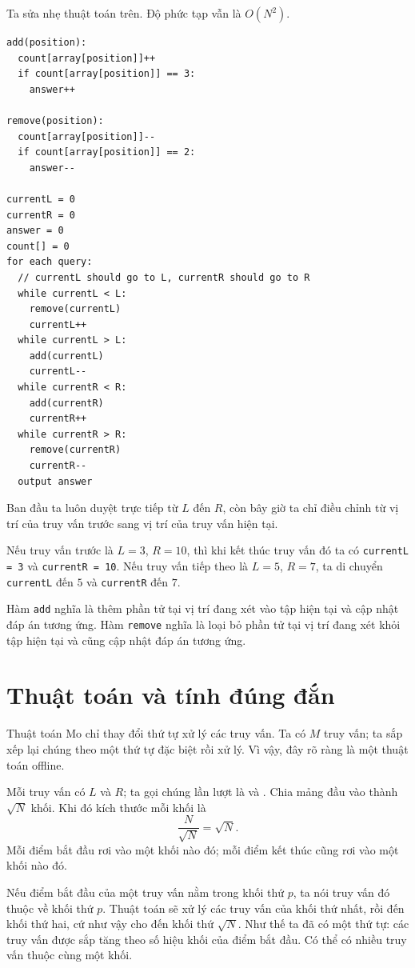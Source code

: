 \documentclass[11pt]{article}
\begin{document}
Ta sửa nhẹ thuật toán trên. Độ phức tạp vẫn là $O(N^2)$.

\begingroup
\small
\begin{verbatim}
add(position):
  count[array[position]]++
  if count[array[position]] == 3:
    answer++

remove(position):
  count[array[position]]--
  if count[array[position]] == 2:
    answer--

currentL = 0
currentR = 0
answer = 0
count[] = 0
for each query:
  // currentL should go to L, currentR should go to R
  while currentL < L:
    remove(currentL)
    currentL++
  while currentL > L:
    add(currentL)
    currentL--
  while currentR < R:
    add(currentR)
    currentR++
  while currentR > R:
    remove(currentR)
    currentR--
  output answer
\end{verbatim}
\endgroup

Ban đầu ta luôn duyệt trực tiếp từ $L$ đến $R$, còn bây giờ ta chỉ điều chỉnh
từ vị trí của truy vấn trước sang vị trí của truy vấn hiện tại.

Nếu truy vấn trước là $L=3$, $R=10$, thì khi kết thúc truy vấn đó ta có
\texttt{currentL = 3} và \texttt{currentR = 10}. Nếu truy vấn tiếp theo là
$L=5$, $R=7$, ta di chuyển \texttt{currentL} đến $5$ và \texttt{currentR} đến
$7$.

Hàm \texttt{add} nghĩa là thêm phần tử tại vị trí đang xét vào tập hiện tại và
cập nhật đáp án tương ứng. Hàm \texttt{remove} nghĩa là loại bỏ phần tử tại vị
trí đang xét khỏi tập hiện tại và cũng cập nhật đáp án tương ứng.

\section{Thuật toán và tính đúng đắn}

Thuật toán Mo chỉ thay đổi thứ tự xử lý các truy vấn. Ta có $M$ truy vấn; ta
sắp xếp lại chúng theo một thứ tự đặc biệt rồi xử lý. Vì vậy, đây rõ ràng là
một thuật toán offline.

Mỗi truy vấn có $L$ và $R$; ta gọi chúng lần lượt là  và
. Chia mảng đầu vào thành $\sqrt N$ khối. Khi đó kích thước
mỗi khối là
\[
  \frac{N}{\sqrt N} = \sqrt N.
\]
Mỗi điểm bắt đầu rơi vào một khối nào đó; mỗi điểm kết thúc cũng rơi vào một
khối nào đó.

Nếu điểm bắt đầu của một truy vấn nằm trong khối thứ $p$, ta nói truy vấn đó
thuộc về khối thứ $p$. Thuật toán sẽ xử lý các truy vấn của khối thứ nhất, rồi
đến khối thứ hai, cứ như vậy cho đến khối thứ $\sqrt N$. Như thế ta đã có một
thứ tự: các truy vấn được sắp tăng theo số hiệu khối của điểm bắt đầu. Có thể
có nhiều truy vấn thuộc cùng một khối.
\end{document}
